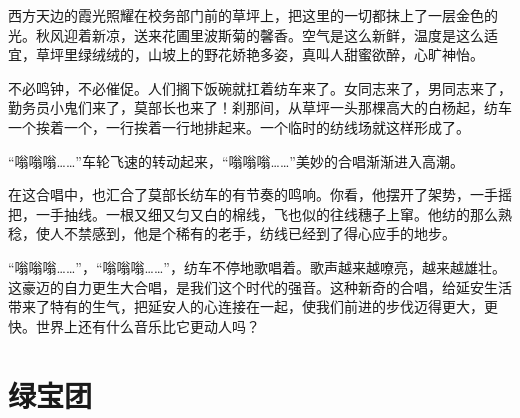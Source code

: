 \documentclass[12pt,UTF-8,openany]{ctexbook}
\begin{document}
\begin{large}
    西方天边的霞光照耀在校务部门前的草坪上，把这里的一切都抹上了一层金色的光。秋风迎着新凉，送来花圃里波斯菊的馨香。空气是这么新鲜，温度是这么适宜，草坪里绿绒绒的，山坡上的野花娇艳多姿，真叫人甜蜜欲醉，心旷神怡。
    
    不必鸣钟，不必催促。人们搁下饭碗就扛着纺车来了。女同志来了，男同志来了，勤务员小鬼们来了，莫部长也来了！刹那间，从草坪一头那棵高大的白杨起，纺车一个挨着一个，一行挨着一行地排起来。一个临时的纺线场就这样形成了。
    
    “嗡嗡嗡……”车轮飞速的转动起来，“嗡嗡嗡……”美妙的合唱渐渐进入高潮。
    
    在这合唱中，也汇合了莫部长纺车的有节奏的鸣响。你看，他摆开了架势，一手摇把，一手抽线。一根又细又匀又白的棉线，飞也似的往线穗子上窜。他纺的那么熟稔，使人不禁感到，他是个稀有的老手，纺线已经到了得心应手的地步。
    
    “嗡嗡嗡……”，“嗡嗡嗡……”，纺车不停地歌唱着。歌声越来越嘹亮，越来越雄壮。这豪迈的自力更生大合唱，是我们这个时代的强音。这种新奇的合唱，给延安生活带来了特有的生气，把延安人的心连接在一起，使我们前进的步伐迈得更大，更快。世界上还有什么音乐比它更动人吗？
    
\end{large}



\chapter{绿宝团}
\end{document}
